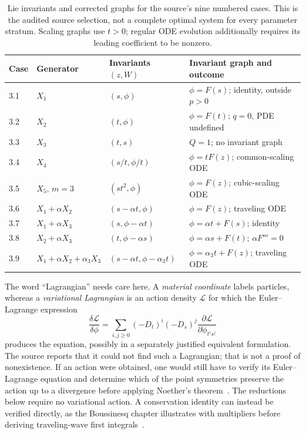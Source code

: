 \begin{table}[htbp]
\centering\small
\begin{tabularx}{\linewidth}{@{}p{.85cm}p{2.6cm}p{2.7cm}X@{}}
\toprule
Case & Generator & Invariants $(z,W)$ & Invariant graph and outcome\\
\midrule
3.1 & $X_1$ & $(s,\phi)$ & $\phi=F(s)$; identity, outside $p>0$\\
3.2 & $X_2$ & $(t,\phi)$ & $\phi=F(t)$; $q=0$, PDE undefined\\
3.3 & $X_3$ & $(t,s)$ & $Q=1$; no invariant graph\\
3.4 & $X_4$ & $(s/t,\phi/t)$ & $\phi=tF(z)$; common-scaling ODE\\
3.5 & $X_5$, $m=3$ & $(st^2,\phi)$ & $\phi=F(z)$; cubic-scaling ODE\\
3.6 & $X_1+\alpha X_2$ & $(s-\alpha t,\phi)$ & $\phi=F(z)$; traveling ODE\\
3.7 & $X_1+\alpha X_3$ & $(s,\phi-\alpha t)$ & $\phi=\alpha t+F(s)$; identity\\
3.8 & $X_2+\alpha X_3$ & $(t,\phi-\alpha s)$ & $\phi=\alpha s+F(t)$; $\alpha F'''=0$\\
3.9 & $X_1+\alpha X_2+\alpha_3X_3$ & $(s-\alpha t,\phi-\alpha_3t)$ & $\phi=\alpha_3t+F(z)$; traveling ODE\\
\bottomrule
\end{tabularx}
\caption{Lie invariants and corrected graphs for the source's nine numbered
cases. This is the audited source selection, not a complete optimal system
for every parameter stratum. Scaling graphs use $t>0$; regular ODE
evolution additionally requires its leading coefficient to be nonzero.}
\label{tab:sve-repro-invariants}
\end{table}

The word ``Lagrangian'' needs care here. A \emph{material coordinate}
labels particles, whereas a \emph{variational Lagrangian} is an action
density $\mathcal L$ for which the Euler--Lagrange expression
\[
 \frac{\delta\mathcal L}{\delta\phi}
 =\sum_{i,j\geq0}(-D_t)^i(-D_s)^j
       \frac{\partial\mathcal L}{\partial\phi_{t^is^j}}
\]
produces the equation, possibly in a separately justified equivalent
formulation. The source reports that it could not find such a
Lagrangian; that is not a proof of nonexistence. If an action were
obtained, one would still have to verify its Euler--Lagrange equation
and determine which of the point symmetries preserve the action up to a
divergence before applying Noether's theorem~\cite{noether}.
The reductions below require no variational action. A conservation
identity can instead be verified directly, as the Boussinesq chapter
illustrates with multipliers before deriving traveling-wave first
integrals~\cite[Sec.~4, pp.~166--169]{bruzon-gandarias-2021}.


